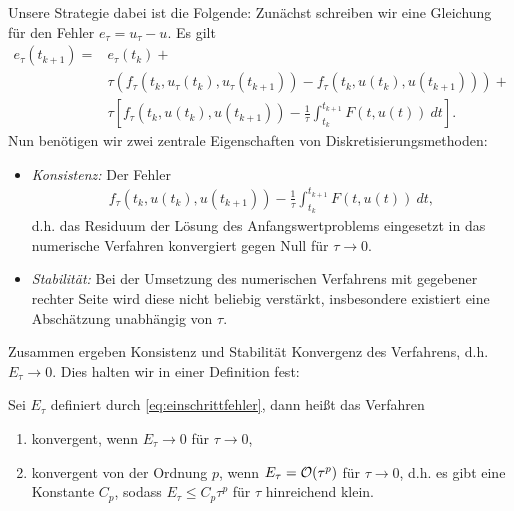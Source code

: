 Unsere Strategie dabei ist die Folgende: Zunächst schreiben wir eine Gleichung für den Fehler $e_\tau = u_\tau - u$. Es gilt
%
\begin{align*} 
e_\tau(t_{k+1}) =& e_\tau(t_k) +\\ 
&\tau (f_\tau(t_k,u_\tau(t_k),u_\tau(t_{k+1})) - f_\tau(t_k,u(t_k),u(t_{k+1}))) 
+ \\ & \tau 
\left[ f_\tau(t_k,u(t_k),u(t_{k+1})) - \frac{1}\tau \int_{t_k}^{t_{k+1}} F(t,u(t))~dt
\right]. 
\end{align*}
%
Nun benötigen wir zwei zentrale Eigenschaften von Diskretisierungsmethoden:
%
\begin{itemize}
\item {\em Konsistenz: } Der Fehler
%
\begin{align*}
f_\tau(t_k,u(t_k),u(t_{k+1})) - \frac{1}{\tau}\int_{t_k}^{t_{k+1}} F(t,u(t))~dt,
\end{align*}
%
d.h. das Residuum der Lösung des Anfangswertproblems eingesetzt in das numerische Verfahren konvergiert gegen Null für $\tau \rightarrow 0$.
%
\item {\em Stabilität: } Bei der Umsetzung des numerischen Verfahrens mit gegebener rechter Seite wird diese nicht beliebig verstärkt, insbesondere existiert eine Abschätzung unabhängig von $\tau.$ 
\end{itemize}
%
Zusammen ergeben Konsistenz und Stabilität Konvergenz des Verfahrens, d.h. $E_\tau \rightarrow 0$. Dies halten wir in einer Definition fest:
%
\begin{definition}{}{}
Sei $E_\tau$ definiert durch \eqref{eq:einschrittfehler}, dann heißt das Verfahren
%
\begin{enumerate}[label=(\roman*)]
\item konvergent, wenn $E_\tau \rightarrow 0$ für $\tau \rightarrow 0$,
%
\item konvergent von der Ordnung $p$, wenn $E_\tau = {\cal O}(\tau^p)$ für $\tau \rightarrow 0$, d.h. es gibt eine Konstante $C_p$, sodass $E_\tau \leq C_p \tau^p$ für $\tau$ hinreichend klein. 
\end{enumerate}
\end{definition}
%
